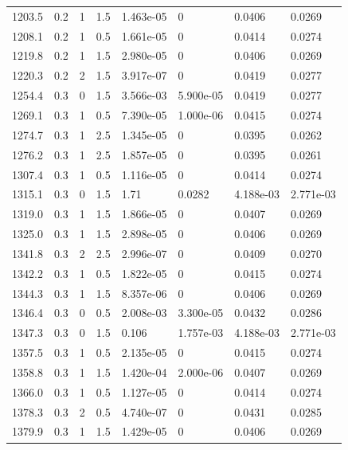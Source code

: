 \documentclass[preview]{standalone}
\begin{document}
{{{\begin{tabular}{L{1.2cm}C{1.2cm} C{0.3cm}C{0.5cm} C{1.4cm}C{1.4cm} C{1.4cm}C{1.4cm}}
  1203.5  &   0.2  & 1     & 1.5 &  1.463e-05  & 0  & 0.0406 &  0.0269   \\ 
  1208.1  &   0.2  & 1     & 0.5 &  1.661e-05  & 0  & 0.0414 &  0.0274   \\ 
  1219.8  &   0.2  & 1     & 1.5 &  2.980e-05  & 0  & 0.0406 &  0.0269   \\ 
  1220.3  &   0.2  & 2     & 1.5 &  3.917e-07  & 0  & 0.0419 &  0.0277   \\ 
  1254.4  &   0.3  & 0     & 1.5 &  3.566e-03  & 5.900e-05  & 0.0419 &  0.0277   \\ 
  1269.1  &   0.3  & 1     & 0.5 &  7.390e-05  & 1.000e-06  & 0.0415 &  0.0274   \\ 
  1274.7  &   0.3  & 1     & 2.5 &  1.345e-05  & 0  & 0.0395 &  0.0262   \\ 
  1276.2  &   0.3  & 1     & 2.5 &  1.857e-05  & 0  & 0.0395 &  0.0261   \\ 
  1307.4  &   0.3  & 1     & 0.5 &  1.116e-05  & 0  & 0.0414 &  0.0274   \\ 
  1315.1  &   0.3  & 0     & 1.5 &  1.71  & 0.0282  & 4.188e-03 &  2.771e-03   \\ 
  1319.0  &   0.3  & 1     & 1.5 &  1.866e-05  & 0  & 0.0407 &  0.0269   \\ 
  1325.0  &   0.3  & 1     & 1.5 &  2.898e-05  & 0  & 0.0406 &  0.0269   \\ 
  1341.8  &   0.3  & 2     & 2.5 &  2.996e-07  & 0  & 0.0409 &  0.0270   \\ 
  1342.2  &   0.3  & 1     & 0.5 &  1.822e-05  & 0  & 0.0415 &  0.0274   \\ 
  1344.3  &   0.3  & 1     & 1.5 &  8.357e-06  & 0  & 0.0406 &  0.0269   \\ 
  1346.4  &   0.3  & 0     & 0.5 &  2.008e-03  & 3.300e-05  & 0.0432 &  0.0286   \\ 
  1347.3  &   0.3  & 0     & 1.5 &  0.106  & 1.757e-03  & 4.188e-03 &  2.771e-03   \\ 
  1357.5  &   0.3  & 1     & 0.5 &  2.135e-05  & 0  & 0.0415 &  0.0274   \\ 
  1358.8  &   0.3  & 1     & 1.5 &  1.420e-04  & 2.000e-06  & 0.0407 &  0.0269   \\ 
  1366.0  &   0.3  & 1     & 0.5 &  1.127e-05  & 0  & 0.0414 &  0.0274   \\ 
  1378.3  &   0.3  & 2     & 0.5 &  4.740e-07  & 0  & 0.0431 &  0.0285   \\ 
  1379.9  &   0.3  & 1     & 1.5 &  1.429e-05  & 0  & 0.0406 &  0.0269   \\ 

\end{tabular}}}}
\end{document}
